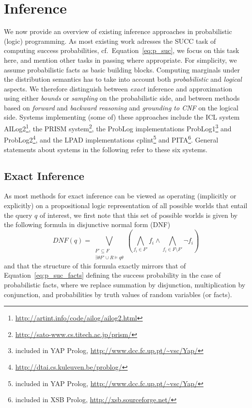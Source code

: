 \documentclass[a4paper]{article}
\begin{document}
\section{Inference}
\label{sec:inference} 
We now provide an overview of existing inference approaches in
probabilistic (logic) programming. As most existing work adresses the
SUCC task of computing success probabilities, 
cf.~Equation~\eqref{eq:p_suc}, we focus on this task here, and mention
other tasks in passing where appropriate. For simplicity, we assume
probabilistic facts as basic building blocks. 
Computing marginals under the distribution semantics has to take
into account both \emph{probabilistic} and \emph{logical} aspects. We
therefore distinguish between \emph{exact}
inference and approximation using either \emph{bounds} or
\emph{sampling} on the probabilistic side, and between methods based
on \emph{forward} and \emph{backward reasoning} and \emph{grounding to
CNF} on the logical side. 
Systems implementing (some of) these approaches include the ICL system
AILog2\footnote{\url{http://artint.info/code/ailog/ailog2.html}}, the 
PRISM system\footnote{\url{http://sato-www.cs.titech.ac.jp/prism/}\label{foot:prism}}, the
ProbLog implementations 
ProbLog1\footnote{included in YAP Prolog,
  \url{http://www.dcc.fc.up.pt/~vsc/Yap/}\label{foot:p1}} and
ProbLog2\footnote{\url{http://dtai.cs.kuleuven.be/problog/}\label{foot:p2}}, and the LPAD implementations cplint\footnote{included in YAP Prolog,
  \url{http://www.dcc.fc.up.pt/~vsc/Yap/}} and PITA\footnote{included
  in XSB Prolog, \url{http://xsb.sourceforge.net/}}. General
statements about systems in the following refer to these six systems.

\subsection{Exact Inference}\label{sec:exact}
As most methods for exact inference can be viewed as operating
(implicitly or explicitly) on a propositional logic representation of
all possible worlds that entail the query $q$ of interest, we first note
that this set of possible worlds is given by the following 
formula in disjunctive normal form (DNF)
\begin{equation}
\label{eq:model_dnf}
DNF(q) = \bigvee_{\substack{F'\subseteq F \\
    \exists\theta F'\cup R\models q\theta}} \left(\bigwedge_{f_i\in
  F'}f_i\wedge\bigwedge_{f_i\in F\setminus F'}\neg f_i\right) 
\end{equation}  
and that the structure of this formula exactly mirrors that of
Equation~\eqref{eq:p_suc_facts} defining  the
success probability in the case of probabilistic facts, where we replace summation by disjunction,
multiplication by conjunction, and probabilities by truth values of
random variables (or facts).  
\end{document}
